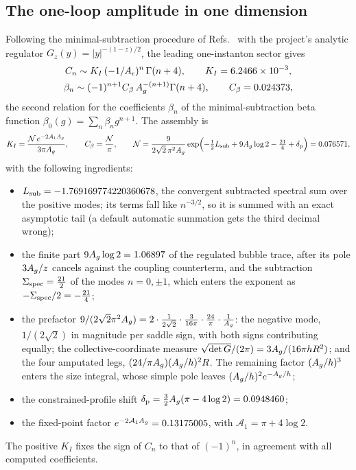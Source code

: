 \subsection{The one-loop amplitude in one dimension}\label{rs:sec:amplitude}
Following the minimal-subtraction procedure of
Refs.~\cite{rs:McKane:2018ocs,rs:McKaneWallaceBonfim} with the project's analytic regulator
$G_z(y)=|y|^{-(1-z)/2}$, the leading one-instanton sector gives
\begin{equation}
 \begin{gathered}
 C_n\sim K_I\,(-1/A_\epsilon)^n\,\Gamma(n+4),\qquad K_I=6.2466\times10^{-3},\\
 \beta_n\sim(-1)^{n+1}C_\beta\,A_g^{-(n+1)}\Gamma(n+4),\qquad C_\beta=0.024373,
 \end{gathered}
 \label{rs:eq:KI}
\end{equation}
the second relation for the coefficients $\beta_n$ of the minimal-subtraction beta
function $\beta_0(g)=\sum_n\beta_ng^{n+1}$. The assembly is
\begin{equation}
 K_I=\frac{\mathcal N\,e^{-2\mathcal A_1A_g}}{3\pi A_g},\qquad
 C_\beta=\frac{\mathcal N}{\pi},\qquad
 \mathcal N=\frac{9}{2\sqrt2\,\pi^2A_g}
 \exp\Bigl(-\tfrac12L_{\rm sub}+9A_g\log2-\tfrac{21}{4}+\delta_{\rm p}\Bigr)=0.076571,
 \label{rs:eq:assembly}
\end{equation}
with the following ingredients:
\begin{itemize}
\item $L_{\rm sub}=-1.769169774220360678$, the convergent subtracted spectral sum over the
positive modes; its terms fall like $n^{-3/2}$, so it is summed with an exact asymptotic tail
(a default automatic summation gets the third decimal wrong);
\item the finite part $9A_g\log2=1.06897$ of the regulated bubble trace, after its pole
$3A_g/z$ cancels against the coupling counterterm, and the subtraction
$\Sigma_{\rm spec}=\frac{21}{2}$ of the modes $n=0,\pm1$, which enters the exponent as
$-\Sigma_{\rm spec}/2=-\frac{21}{4}$;
\item the prefactor $9/(2\sqrt2\pi^2A_g)=2\cdot\frac{1}{2\sqrt2}\cdot\frac{3}{16\pi}\cdot
\frac{24}{\pi}\cdot\frac1{A_g}$: the negative mode, $1/(2\sqrt2)$ in magnitude per saddle sign,
with both signs contributing equally; the collective-coordinate measure
$\sqrt{\det G}/(2\pi)=3A_g/(16\pi hR^2)$; and the four amputated legs,
$(24/\pi A_g)(A_g/h)^2R$. The remaining factor $(A_g/h)^3$ enters the size integral, whose
simple pole leaves $(A_g/h)^2e^{-A_g/h}$;
\item the constrained-profile shift $\delta_{\rm p}=\frac32A_g(\pi-4\log2)=0.0948460$;
\item the fixed-point factor $e^{-2\mathcal A_1A_g}=0.13175005$, with
$\mathcal A_1=\pi+4\log2$.
\end{itemize}
The positive $K_I$ fixes the sign of $C_n$ to that of $(-1)^n$, in agreement with all
computed coefficients.

